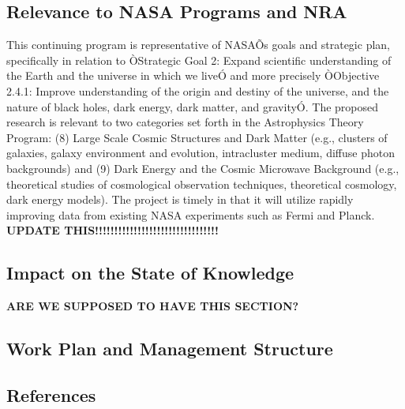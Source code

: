 \documentclass[useAMS,12pt]{article}
\begin{document}
\subsection{Relevance to NASA Programs and NRA}
This continuing program is representative of NASAÕs goals and strategic plan, specifically in relation to ÒStrategic Goal 2: Expand scientific understanding of the Earth and the universe in which we liveÓ and more precisely ÒObjective 2.4.1: Improve understanding of the origin and destiny of the universe, and the nature of black holes, dark energy, dark matter, and gravityÓ.  The proposed research is relevant to two categories set forth in the Astrophysics Theory Program: (8) Large Scale Cosmic Structures and Dark Matter (e.g., clusters of galaxies, galaxy environment and evolution, intracluster medium, diffuse photon backgrounds) and (9) Dark Energy and the Cosmic Microwave Background (e.g., theoretical studies of cosmological observation techniques, theoretical cosmology, dark energy models).  The project is timely in that it will utilize rapidly improving data from existing NASA experiments such as Fermi and Planck.  {\bf UPDATE THIS!!!!!!!!!!!!!!!!!!!!!!!!!!!!!!!!}

\subsection{Impact on the State of Knowledge}
{\bf ARE WE SUPPOSED TO HAVE THIS SECTION?}


\subsection{Work Plan and Management Structure}

\subsection{References}
\end{document}
